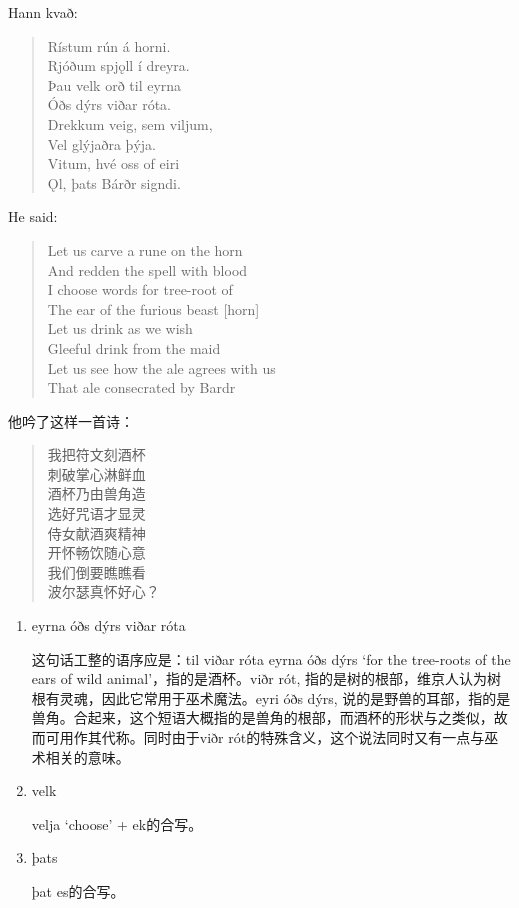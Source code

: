 \begin{paracol}{2}
  Hann kvað:
  \begin{quote}
    Rístum rún á horni.\\
    Rjóðum spjǫll í dreyra.\\
    Þau velk orð til eyrna\\
    Óðs dýrs viðar róta.\\
    Drekkum veig, sem viljum,\\
    Vel glýjaðra þýja.\\
    Vitum, hvé oss of eiri\\
    \MakeUppercase ǫl, þats Bárðr signdi.
  \end{quote}

  \switchcolumn
  He said:
  \begin{quote}
    Let us carve a rune on the horn\\
    And redden the spell with blood\\
    I choose words for tree-root of\\
    The ear of the furious beast [horn]\\
    Let us drink as we wish\\
    Gleeful drink from the maid\\
    Let us see how the ale agrees with us\\
    That ale consecrated by Bardr
  \end{quote}

\end{paracol}
\begin{translation*}{}
  他吟了这样一首诗：
  \begin{quote}
    我把符文刻酒杯\\
    刺破掌心淋鲜血\\
    酒杯乃由兽角造\\
    选好咒语才显灵\\
    侍女献酒爽精神\\
    开怀畅饮随心意\\
    我们倒要瞧瞧看\\
    波尔瑟真怀好心？\\
  \end{quote}
\end{translation*}
\begin{grammar*}{}
  \begin{enumerate}[leftmargin=*]
    \item eyrna óðs dýrs viðar róta

          这句话工整的语序应是：til viðar róta eyrna óðs dýrs `for the tree-roots of the ears of wild animal'，指的是酒杯。viðr rót, 指的是树的根部，维京人认为树根有灵魂，因此它常用于巫术魔法。eyri óðs dýrs, 说的是野兽的耳部，指的是兽角。合起来，这个短语大概指的是兽角的根部，而酒杯的形状与之类似，故而可用作其代称。同时由于viðr rót的特殊含义，这个说法同时又有一点与巫术相关的意味。

    \item velk

          velja `choose' + ek的合写。
    \item þats

          þat es的合写。

  \end{enumerate}
\end{grammar*}
